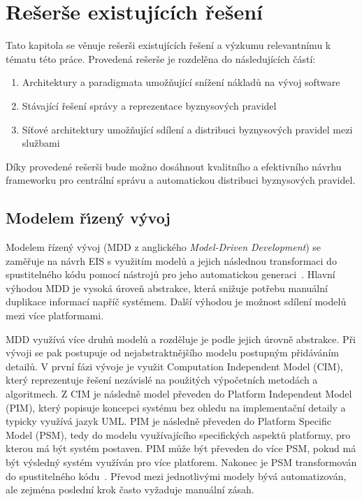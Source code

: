 
\chapter{Rešerše existujících řešení}\label{ch:reserse}

Tato kapitola se věnuje rešerši existujících řešení a výzkumu relevantnímu k tématu této práce.
Provedená rešerše je rozdelěna do následujících částí:

\begin{enumerate}
    \item Architektury a paradigmata umožňující snížení nákladů na vývoj software
    \item Stávající řešení správy a reprezentace byznysových pravidel
    \item Síťové architektury umožňující sdílení a distribuci byznysových pravidel mezi službami
\end{enumerate}

Díky provedené rešerši bude možno dosáhnout kvalitního a efektivního návrhu
frameworku pro centrální správu a automatickou distribuci byznysových pravidel.

\section{Modelem ř\'{\i}zený vývoj}

Modelem řízený vývoj (\gls{MDD} z anglického \textit{Model-Driven
Development}) se zaměřuje na návrh \gls{EIS} s využitím modelů a jejich
následnou transformaci do spustitelného kódu pomocí nástrojů pro jeho automatickou
generaci~\cite{selic2003pragmatics, soley2000model}. Hlavní výhodou \gls{MDD} je vysoká
úroveň abstrakce, která snižuje potřebu manuální duplikace informací napříč systémem.
Další výhodou je možnost sdílení modelů mezi více platformami.

\gls{MDD} využívá více druhů modelů a rozděluje je podle jejich úrovně abstrakce.
Při vývoji se pak postupuje od nejabstraktnějšího modelu postupným přidáváním detailů.
V první fázi vývoje je využit Computation Independent Model (\gls{CIM}), který reprezentuje
řešení nezávislé na použitých výpočetních metodách a algoritmech. Z \gls{CIM} je
následně model převeden do Platform Independent Model (\gls{PIM}),
který popisuje koncepci systému bez ohledu na implementační detaily a typicky
využívá jazyk \gls{UML}. \gls{PIM} je následně převeden do
Platform Specific Model (\gls{PSM}), tedy do modelu využívajícího
specifických aspektů platformy, pro kterou má být systém postaven.
\gls{PIM} může být převeden do více \gls{PSM}, pokud má být výsledný systém využíván pro více platforem.
Nakonec je \gls{PSM} transformován do spustitelného kódu~\cite{kleppe2003model}.
Převod mezi jednotlivými modely bývá automatizován, ale zejména poslední krok
často vyžaduje manuální zásah.

